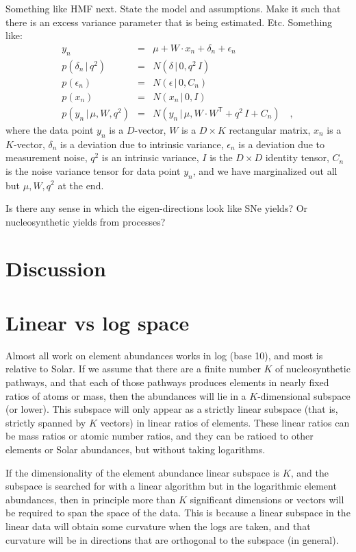 \documentclass[12pt]{article}
\newcommand{\given}{\,|\,}
\newcommand{\trans}[1]{{#1}^{\!\mathsf{T}}}
\begin{document}
Something like HMF next. State the model and assumptions. Make it such that
there is an excess variance parameter that is being estimated. Etc.
Something like:
\begin{eqnarray}
y_n &=& \mu + W\cdot x_n + \delta_n + \epsilon_n
\\
p(\delta_n\given q^2) &=& N(\delta\given 0, q^2\,I)
\\
p(\epsilon_n) &=& N(\epsilon\given 0, C_n)
\\
p(x_n) &=& N(x_n\given 0, I)
\\
p(y_n\given \mu,W,q^2) &=& N(y_n\given \mu, W\cdot\trans{W}+q^2\,I+C_n)
\quad ,
\end{eqnarray}
where the data point $y_n$ is a $D$-vector,
$W$ is a $D\times K$ rectangular matrix,
$x_n$ is a $K$-vector,
$\delta_n$ is a deviation due to intrinsic variance,
$\epsilon_n$ is a deviation due to measurement noise,
$q^2$ is an intrinsic variance,
$I$ is the $D\times D$ identity tensor,
$C_n$ is the noise variance tensor for data point $y_n$,
and we have marginalized out all but $\mu,W,q^2$ at the end.

Is there any sense in which the eigen-directions look like SNe yields?
Or nucleosynthetic yields from processes?

\section{Discussion}

\appendix
\section{Linear vs log space}

Almost all work on element abundances works in log (base 10), and most is
relative to Solar.
If we assume that there are a finite number $K$ of nucleosynthetic pathways,
and that each of those pathways produces elements in nearly fixed
ratios of atoms or mass, then the abundances will lie in a $K$-dimensional
subspace (or lower).
This subspace will only appear as a strictly linear subspace (that is, strictly
spanned by $K$ vectors) in linear ratios of elements.
These linear ratios can be mass ratios or atomic number ratios, and they can be ratioed
to other elements or Solar abundances, but without taking logarithms.

If the dimensionality of the element abundance linear subspace is $K$, and the
subspace is searched for with a linear algorithm but in the logarithmic element
abundances, then in principle more than $K$ significant dimensions or vectors
will be required to span the space of the data.
This is because a linear subspace in the linear data will obtain some curvature
when the logs are taken, and that curvature will be in directions that are orthogonal
to the subspace (in general).
\end{document}
